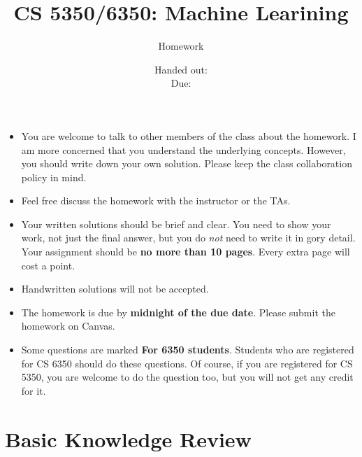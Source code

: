 \documentclass[12pt, fullpage,letterpaper]{article}
\title{CS 5350/6350: Machine Learining \semester}
\author{Homework \assignmentId}
\date{Handed out: \releaseDate\\
  Due: \dueDate}
\begin{document}
\maketitle


\footnotesize
	\begin{itemize}
		\item You are welcome to talk to other members of the class about
		the homework. I am more concerned that you understand the
		underlying concepts. However, you should write down your own
		solution. Please keep the class collaboration policy in mind.
		
		\item Feel free discuss the homework with the instructor or the TAs.
		
		\item Your written solutions should be brief and clear. You need to
		show your work, not just the final answer, but you do \emph{not}
		need to write it in gory detail. Your assignment should be {\bf no
			more than 10 pages}. Every extra page will cost a point.
		
		\item Handwritten solutions will not be accepted.
		
		\item The homework is due by \textbf{midnight of the due date}. Please submit
		the homework on Canvas.
		
		\item Some questions are marked {\bf For 6350 students}. Students
		who are registered for CS 6350 should do these questions. Of
		course, if you are registered for CS 5350, you are welcome to do
		the question too, but you will not get any credit for it.
		
	\end{itemize}



\section*{Basic Knowledge Review}
\label{sec:q1}

\end{document}
